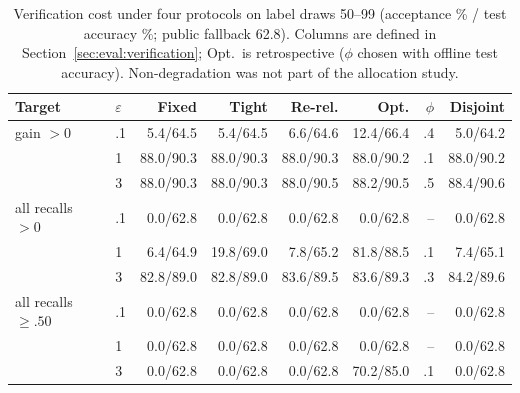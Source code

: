 \begin{table}[t]
\caption{Verification cost under four protocols on label draws 50--99 (acceptance \% / test accuracy \%; public fallback 62.8). Columns are defined in Section~\ref{sec:eval:verification}; Opt.\ is retrospective ($\phi$ chosen with offline test accuracy). Non-degradation was not part of the allocation study.}
\label{tab:cost}\small\setlength{\tabcolsep}{1.6pt}
\centering
\begin{tabular}{@{}llrrrrrr@{}}\toprule
Target & $\varepsilon$ & Fixed & Tight & Re-rel. & Opt. & $\phi$ & Disjoint \\
\midrule
gain $>0$ & .1 & 5.4/64.5 & 5.4/64.5 & 6.6/64.6 & 12.4/66.4 & .4 & 5.0/64.2 \\
 & 1 & 88.0/90.3 & 88.0/90.3 & 88.0/90.3 & 88.0/90.2 & .1 & 88.0/90.2 \\
 & 3 & 88.0/90.3 & 88.0/90.3 & 88.0/90.5 & 88.2/90.5 & .5 & 88.4/90.6 \\
all recalls $>0$ & .1 & 0.0/62.8 & 0.0/62.8 & 0.0/62.8 & 0.0/62.8 & -- & 0.0/62.8 \\
 & 1 & 6.4/64.9 & 19.8/69.0 & 7.8/65.2 & 81.8/88.5 & .1 & 7.4/65.1 \\
 & 3 & 82.8/89.0 & 82.8/89.0 & 83.6/89.5 & 83.6/89.3 & .3 & 84.2/89.6 \\
all recalls $\ge.50$ & .1 & 0.0/62.8 & 0.0/62.8 & 0.0/62.8 & 0.0/62.8 & -- & 0.0/62.8 \\
 & 1 & 0.0/62.8 & 0.0/62.8 & 0.0/62.8 & 0.0/62.8 & -- & 0.0/62.8 \\
 & 3 & 0.0/62.8 & 0.0/62.8 & 0.0/62.8 & 70.2/85.0 & .1 & 0.0/62.8 \\
\bottomrule\end{tabular}
\end{table}
